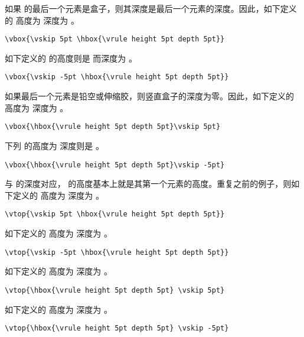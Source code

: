\documentclass{book}
\begin{document}
如果  的最后一个元素是盒子，则其深度是最后一个元素的深度。因此，如下定义的  高度为 \n{10pt} 深度为 \n{5pt}。
\begin{verbatim}
\vbox{\vskip 5pt \hbox{\vrule height 5pt depth 5pt}}
\end{verbatim}
如下定义的  的高度则是 \n{0pt} 而深度为 \n{5pt}。
\begin{verbatim}
\vbox{\vskip -5pt \hbox{\vrule height 5pt depth 5pt}}
\end{verbatim}
如果最后一个元素是铅空或伸缩胶，则竖直盒子的深度为零。因此，如下定义的  高度为 \n{15pt} 深度为 \n{0pt}。
\begin{verbatim}
\vbox{\hbox{\vrule height 5pt depth 5pt}\vskip 5pt}
\end{verbatim}
下列  的高度为 \n{5pt} 深度则是 \n{0pt}。
\begin{verbatim}
\vbox{\hbox{\vrule height 5pt depth 5pt}\vskip -5pt}
\end{verbatim}

与  的深度对应， 的高度基本上就是其第一个元素的高度。重复之前的例子，则如下定义的  高度为 \n{0pt} 深度为 \n{15pt}。
\begin{verbatim}
\vtop{\vskip 5pt \hbox{\vrule height 5pt depth 5pt}}
\end{verbatim}
如下定义的  高度为 \n{0pt} 深度为 \n{5pt}。
\begin{verbatim}
\vtop{\vskip -5pt \hbox{\vrule height 5pt depth 5pt}}
\end{verbatim}
如下定义的  高度为 \n{5pt} 深度为 \n{10pt}。
\begin{verbatim}
\vtop{\hbox{\vrule height 5pt depth 5pt} \vskip 5pt}
\end{verbatim}
如下定义的  高度为 \n{5pt} 深度为 \n{0pt}。
\begin{verbatim}
\vtop{\hbox{\vrule height 5pt depth 5pt} \vskip -5pt}
\end{verbatim}
\end{document}
